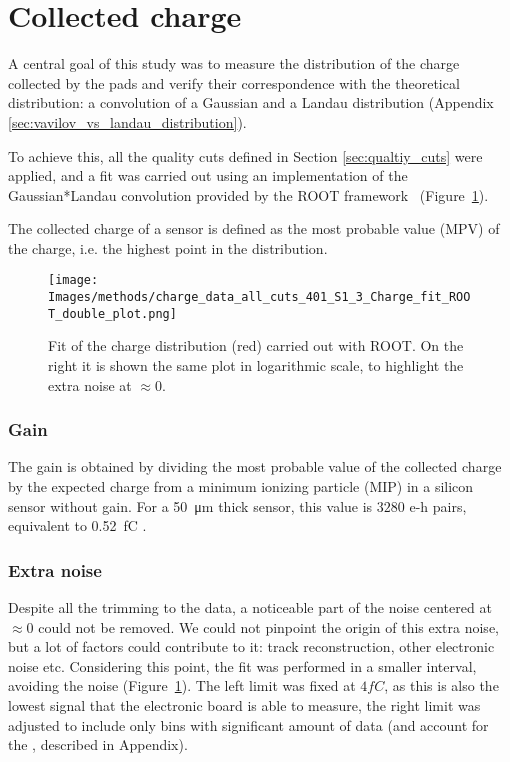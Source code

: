 \section{Collected charge}\label{sec:methods_collected_charge}

A central goal of this study was to measure the distribution of the charge collected by the pads and verify their correspondence with the theoretical distribution: a convolution of a Gaussian and a Landau distribution (Appendix \ref{sec:vavilov_vs_landau_distribution}).

To achieve this, all the quality cuts defined in Section \ref{sec:qualtiy_cuts} were applied, and a fit was carried out using an implementation of the Gaussian*Landau convolution provided by the ROOT framework~\cite{Brun:1997pa} (Figure~\ref{fig:charge_ROOT_fit}).

The collected charge of a sensor is defined as the most probable value (MPV) of the charge, i.e. the highest point in the distribution.

\begin{figure}[h!tbp]
    \centering
    \texttt{[image: Images/methods/charge\_data\_all\_cuts\_401\_S1\_3\_Charge\_fit\_ROOT\_double\_plot.png]}
    \captionsetup{width=\captionwidth}
    \caption{Fit of the charge distribution (red) carried out with ROOT. On the right it is shown the same plot in logarithmic scale, to highlight the extra noise at \(\approx 0\).}
    \label{fig:charge_ROOT_fit}
\end{figure}

\subsubsection{Gain}
The gain is obtained by dividing the most probable value of the collected charge by the expected charge from a minimum ionizing particle (MIP) in a silicon sensor without gain. For a \qty{50}{\micro\meter} thick sensor, this value is \(3280\) e-h pairs, equivalent to \qty{.52}{\femto\coulomb} \cite{meroli_energy_loss2011}.

\subsubsection{Extra noise}
Despite all the trimming to the data, a noticeable part of the noise centered at \(\approx 0\) could not be removed. We could not pinpoint the origin of this extra noise, but a lot of factors could contribute to it: track reconstruction, other electronic noise etc.
Considering this point, the fit was performed in a smaller interval, avoiding the noise (Figure~\ref{fig:charge_ROOT_fit}). The left limit was fixed at \(4\si{fC}\), as this is also the lowest signal that the electronic board is able to measure, the right limit was adjusted to include only bins with significant amount of data (and account for the , described in Appendix).

